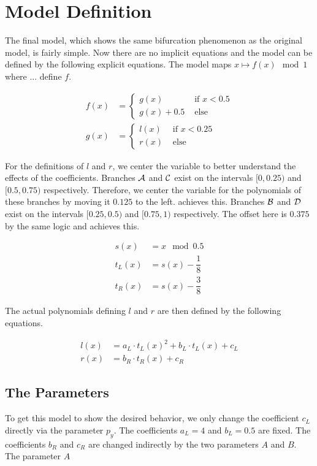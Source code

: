 \section{Model Definition}

The final model, which shows the same bifurcation phenomenon as the original model, is fairly simple.
Now there are no implicit equations and the model can be defined by the following explicit equations.
The model maps $x \mapsto f(x) \mod 1$ where ... define $f$.

\begin{align}
    f(x) & = \begin{cases}
                 g(x)       & \text{ if } x < 0.5 \\
                 g(x) + 0.5 & \text{ else}
             \end{cases} \\
    g(x) & = \begin{cases}
                 l(x) & \text{ if } x < 0.25 \\
                 r(x) & \text{ else}
             \end{cases}
\end{align}

For the definitions of $l$ and $r$, we center the variable to better understand the effects of the coefficients.
Branches $\mathcal{A}$ and $\mathcal{C}$ exist on the intervals $[0, 0.25)$ and $[0.5, 0.75)$ respectively.
Therefore, we center the variable for the polynomials of these branches by moving it $0.125$ to the left.
 achieves this.
Branches $\mathcal{B}$ and $\mathcal{D}$ exist on the intervals $[0.25, 0.5)$ and $[0.75, 1)$ respectively.
The offset here is $0.375$ by the same logic and  achieves this.

\begin{align}
    s(x)   & = x \mod 0.5                                   \\
    t_L(x) & = s(x) - \dfrac{1}{8} \label{equ:final.def.tl} \\
    t_R(x) & = s(x) - \dfrac{3}{8} \label{equ:final.def.tr}
\end{align}

The actual polynomials defining $l$ and $r$ are then defined by the following equations.

\begin{align}
    l(x) & = a_L \cdot t_L(x)^2 + b_L \cdot t_L(x) + c_L \\
    r(x) & = b_R \cdot t_R(x) + c_R
\end{align}

\subsection{The Parameters}

To get this model to show the desired behavior, we only change the coefficient $c_L$ directly via the parameter $p_y$.
The coefficients $a_L = 4$ and $b_L = 0.5$ are fixed.
The coefficients $b_R$ and $c_R$ are changed indirectly by the two parameters $A$ and $B$.
The parameter $A$
